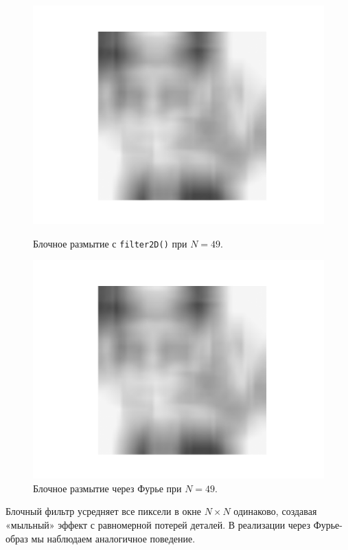 \documentclass[a4paper]{article}
\begin{document}
\begin{figure}[H]
  \centering
  \begin{minipage}{0.49\textwidth}
    \centering
    \includegraphics[width=\textwidth]{src/box_49.png}
    \caption{Блочное размытие с \texttt{filter2D()} при $N=49$.}
  \end{minipage}
  \begin{minipage}{0.49\textwidth}
    \centering
    \includegraphics[width=\textwidth]{src/ifft_box_49.png}
    \caption{Блочное размытие через Фурье при $N=49$.}
  \end{minipage}
\end{figure}

\noindent Блочный фильтр усредняет все пиксели в окне $N\times N$ одинаково, создавая «мыльный» эффект с равномерной потерей деталей. В реализации через Фурье-образ мы наблюдаем аналогичное поведение.
\end{document}

